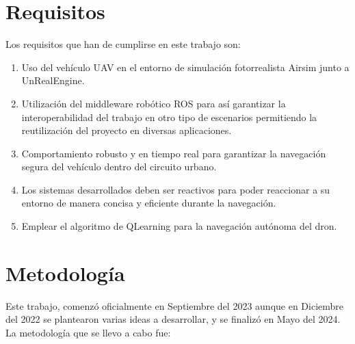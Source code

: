 \section{Requisitos}
\label{sec:requisitos}

Los requisitos que han de cumplirse en este trabajo son: 
\begin{enumerate}
    \item Uso del vehículo UAV en el entorno de simulación fotorrealista Airsim junto a UnRealEngine.
    \item Utilización del middleware robótico ROS para así garantizar la interoperabilidad del trabajo en otro tipo de escenarios permitiendo
    la reutilización del proyecto en diversas aplicaciones. 
    \item Comportamiento robusto y en tiempo real para garantizar la navegación segura del vehículo dentro del circuito urbano.
    \item Los sistemas desarrollados deben ser reactivos para poder reaccionar a su entorno de manera concisa y eficiente durante
    la navegación.
    \item Emplear el algoritmo de QLearning para la navegación autónoma del dron. 
\end{enumerate}


\section{Metodología}
\label{sec:metodologia}

Este trabajo, comenzó oficialmente en Septiembre del 2023 aunque en Diciembre del 2022 se plantearon varias ideas a desarrollar, y se finalizó en Mayo del 2024. \\

La metodología que se llevo a cabo fue:

